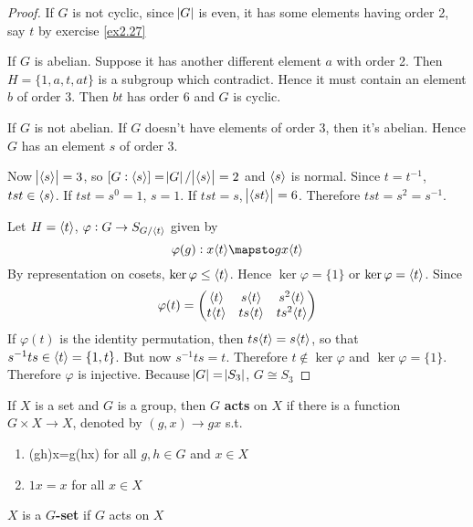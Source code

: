 \documentclass[11pt]{article}
\begin{document}
\begin{proof}


If \(G\) is not cyclic, since \(\abs{G}\) is even, it has some elements having
order 2, say \(t\) by exercise \ref{ex2.27}

If \(G\) is abelian. Suppose it has another different element \(a\) with order 2.
Then \(H=\{1,a,t,at\}\) is a subgroup which contradict. Hence it must contain
an element \(b\) of order 3. Then \(bt\) has order 6 and \(G\) is cyclic.

If \(G\) is not abelian. If \(G\) doesn't have elements of order 3, then it's
abelian. Hence \(G\) has an element \(s\) of order 3.

Now \(\abs{\langle s\rangle}=3\), so \([G:\langle s\rangle]=\abs{G}/\abs{\langle s\rangle}=2\) and \(\langle
s\rangle\) is normal. 
Since \(t=t^{-1}\), \(tst\in\langle s\rangle\). If \(tst=s^0=1\), \(s=1\).
If \(tst=s\), \(\abs{\langle st\rangle}=6\). Therefore \(tst=s^2=s^{-1}\).

Let \(H=\langle t\rangle\), \(\varphi:G\to S_{G/\langle t\rangle}\) given by
\begin{equation*}
\varphi(g):x\la t\ra\mapsto gx\la t\ra
\end{equation*}
By representation on cosets, \(\ker\varphi\le\langle t\rangle\). Hence
\(\ker\varphi=\{1\}\) or \(\ker\varphi=\langle t\rangle\). Since
\begin{equation*}
\varphi(t)=
\begin{pmatrix}
\langle t\rangle&s\langle t\rangle&s^2\langle t\rangle\\
t\langle t\rangle&ts\langle t\rangle&ts^2\langle t \rangle
\end{pmatrix}
\end{equation*}
If \(\varphi(t)\) is the identity permutation, then \(ts\langle t\rangle=s\langle t\rangle\), so
that \(s^{-1}ts\in\langle t\rangle=\{1,t\}\). But now \(s^{-1}ts=t\). Therefore
\(t\not\in\ker\varphi\) and \(\ker\varphi=\{1\}\). Therefore \(\varphi\) is
injective. Because \(\abs{G}=\abs{S_3}\), \(G\cong S_3\)
\end{proof}


\begin{definition}[]
If \(X\) is a set and \(G\) is a group, then \(G\) \textbf{acts} on \(X\) if there is a
function \(G\times X\to X\), denoted by \((g,x)\to gx\) s.t.
\begin{enumerate}
\item (gh)x=g(hx) for all \(g,h\in G\) and \(x\in X\)
\item \(1x=x\) for all \(x\in X\)
\end{enumerate}


\(X\) is a \textbf{\(G\)-set} if \(G\) acts on \(X\)
\end{definition}
\end{document}
